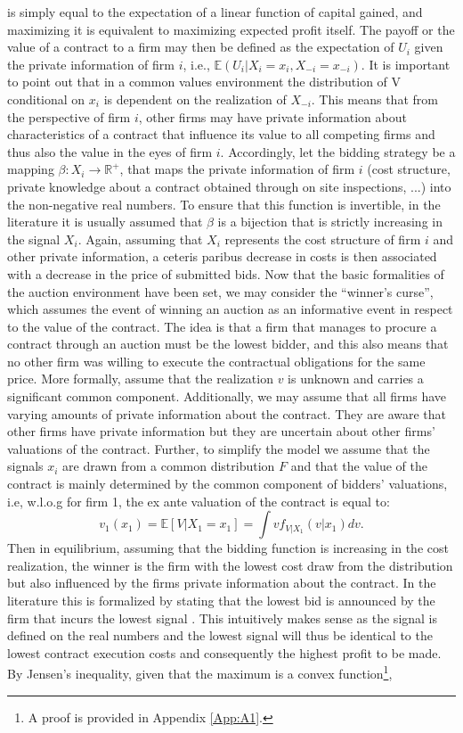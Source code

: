\documentclass[a4paper,12pt, headsepline]{scrartcl}
\numberwithin{equation}{section}
\begin{document}
is simply equal to the expectation of a linear function of capital gained, and maximizing it is equivalent to maximizing expected profit itself. The payoff or the value of a contract to a firm may then be defined as the expectation of $U_i$ given the private information of firm $i$, i.e., $\mathbb{E}(U_i|X_i = x_i, X_{-i} = x_{-i})$. It is important to point out that in a common values environment the distribution of V conditional on $x_{i}$ is dependent on the realization of $X_{-i}$. This means that from the perspective of firm $i$, other firms may have private information about characteristics of a contract that influence its value to all competing firms and thus also the value in the eyes of firm $i$. Accordingly, let the bidding strategy be a mapping $\beta: X_i \rightarrow \mathbb{R}^+$, that maps the private information of firm $i$ (cost structure, private knowledge about a contract obtained through on site inspections, ...) into the non-negative real numbers. To ensure that this function is invertible, in the literature it is usually assumed that $\beta$ is a bijection that is strictly increasing in the signal $X_i$. Again, assuming that $X_i$ represents the cost structure of firm $i$ and other private information, a ceteris paribus decrease in costs is then associated with a decrease in the price of submitted bids. Now that the basic formalities of the auction environment have been set, we may consider the \enquote{winner's curse}, which assumes the event of winning an auction as an informative event in respect to the value of the contract. The idea is that a firm that manages to procure a contract through an auction must be the lowest bidder, and this also means that no other firm was willing to execute the contractual obligations for the same price. More formally, assume that the realization $v$ is unknown and carries a significant common component. Additionally, we may assume that all firms have varying amounts of private information about the contract. They are aware that other firms have private information but they are uncertain about other firms' valuations of the contract. Further, to simplify the model we assume that the signals $x_i$ are drawn from a common distribution $F$ and that the value of the contract is mainly determined by the common component of bidders' valuations, i.e, w.l.o.g for firm 1, the ex ante valuation of the contract is equal to:
\[
v_1(x_1) = \mathbb{E}[V|X_1 = x_1]  = \int vf_{V|X_1}(v|x_1)dv.
\]
 Then in equilibrium, assuming that the bidding function is increasing in the cost realization, the winner is the firm with the lowest cost draw from the distribution but also influenced by the firms private information about the contract. In the literature this is formalized by stating that the lowest bid is announced by the firm that incurs the lowest signal \citep{HandbookIndustrialOrga}. This intuitively makes sense as the signal is defined on the real numbers and the lowest signal will thus be identical to the lowest contract execution costs and consequently the highest profit to be made. By Jensen's inequality, given that the maximum is a convex function\footnote{A proof is provided in Appendix \ref{App:A1}.}, 
\end{document}
